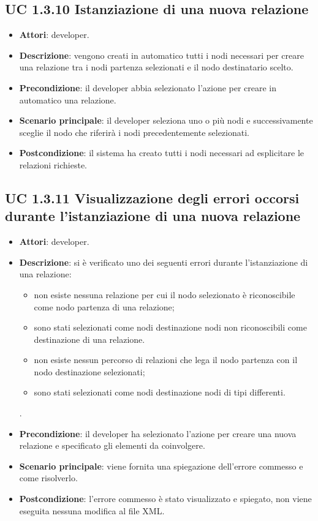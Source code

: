 	\subsection{UC 1.3.10 Istanziazione di una nuova relazione}
		\label{subsec:XEUC1.3.10}
		
		\begin{itemize}
			\item\textbf{Attori}: developer.
			\item\textbf{Descrizione}: vengono creati in automatico tutti i nodi necessari per creare una relazione tra i nodi partenza selezionati e il nodo destinatario scelto.
			\item\textbf{Precondizione}: il developer abbia selezionato l'azione per creare in automatico una relazione.
			\item\textbf{Scenario principale}: il developer seleziona uno o più nodi e successivamente sceglie il nodo che riferirà i nodi precedentemente selezionati.
			\item\textbf{Postcondizione}: il sistema ha creato tutti i nodi necessari ad esplicitare le relazioni richieste.
		\end{itemize}
		
	\subsection{UC 1.3.11 Visualizzazione degli errori occorsi durante l'istanziazione di una nuova relazione}
		\label{subsec:XEUC1.3.11}
		
		\begin{itemize}
			\item\textbf{Attori}: developer.
			\item\textbf{Descrizione}: si è verificato uno dei seguenti errori durante l'istanziazione di una relazione:
			\begin{itemize}
				\item non esiste nessuna relazione per cui il nodo selezionato è riconoscibile come nodo partenza di una relazione;
				\item sono stati selezionati come nodi destinazione nodi non riconoscibili come destinazione di una relazione.
				\item non esiste nessun percorso di relazioni che lega il nodo partenza con il nodo destinazione selezionati;
				\item sono stati selezionati come nodi destinazione nodi di tipi differenti.
			\end{itemize}.
			\item\textbf{Precondizione}: il developer ha selezionato l'azione per creare una nuova relazione e specificato gli elementi da coinvolgere.
			\item\textbf{Scenario principale}: viene fornita una spiegazione dell'errore commesso e come risolverlo.
			\item\textbf{Postcondizione}: l'errore commesso è stato visualizzato e spiegato, non viene eseguita nessuna modifica al file XML.
		\end{itemize}
		
